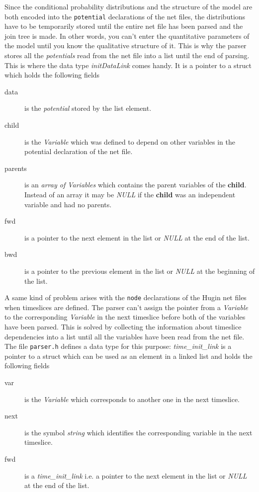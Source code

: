 \documentclass[12pt,a4paper]{report}
\begin{document}
Since the conditional probability distributions and the structure of
the model are both encoded into the \verb+potential+ declarations of
the net files, the distributions have to be temporarily stored until
the entire net file has been parsed and the join tree is made. In
other words, you can't enter the quantitative parameters of the model
until you know the qualitative structure of it. This is why the parser
stores all the {\it potentials} read from the net file into a list
until the end of parsing. This is where the data type 
{\it initDataLink} comes handy. It is a pointer to a struct which
holds the following fields
\begin{description}
\item[data] is the {\it potential} stored by the list element.
\item[child] is the {\it Variable} which was defined to depend on
other variables in the potential declaration of the net file.
\item[parents] is an {\it array of Variables} which contains the
parent variables of the \textbf{child}. Instead of an array it may be
{\it NULL} if the \textbf{child} was an independent variable and had
no parents.
\item[fwd] is a pointer to the next element in the list or {\it NULL}
at the end of the list.
\item[bwd] is a pointer to the previous element in the list or {\it NULL}
at the beginning of the list.
\end{description}

A same kind of problem arises with the \verb+node+ declarations of the
Hugin net files when timeslices are defined. The parser can't assign
the pointer from a {\it Variable} to the corresponding {\it Variable}
in the next timeslice before both of the variables have been
parsed. This is solved by collecting the information about timeslice 
dependencies into a list until all the variables have been read from
the net file. The file \verb+parser.h+ defines a data type for this
purpose: {\it time\_init\_link} is a pointer to a struct which can be
used as an element in a linked list and holds the following fields
\begin{description}\item[var] is the {\it Variable} which corresponds to another one in
the next timeslice.
\item[next] is the symbol {\it string} which identifies the corresponding 
variable in the next timeslice.
\item[fwd] is a {\it time\_init\_link} i.e. a pointer to the next
element in the list or {\it NULL} at the end of the list.
\end{description}
\end{document}
